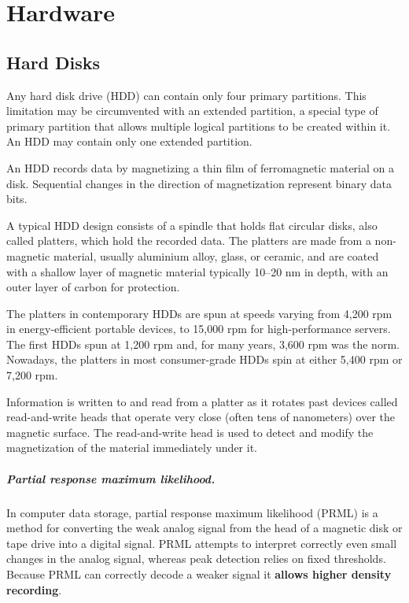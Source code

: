 \documentclass[oneside]{book} %
\theoremstyle{plain}
\begin{document}
\chapter{Hardware}
\section{Hard Disks}
Any hard disk drive (HDD) can contain only four primary partitions. This
limitation may be circumvented with an extended partition, a special type of
primary partition that allows multiple logical partitions to be created within
it. An HDD may contain only one extended partition.

An HDD records data by magnetizing a thin film of ferromagnetic material on a
disk. Sequential changes in the direction of magnetization represent binary
data bits.

A typical HDD design consists of a spindle that holds flat circular disks, also
called platters, which hold the recorded data. The platters are made from a
non-magnetic material, usually aluminium alloy, glass, or ceramic, and are
coated with a shallow layer of magnetic material typically 10–20 nm in depth,
with an outer layer of carbon for protection.

The platters in contemporary HDDs are spun at speeds varying from 4,200 rpm in
energy-efficient portable devices, to 15,000 rpm for high-performance servers.
The first HDDs spun at 1,200 rpm and, for many years, 3,600 rpm was the norm.
Nowadays, the platters in most consumer-grade HDDs spin at either 5,400 rpm or
7,200 rpm.

Information is written to and read from a platter as it rotates past devices
called read-and-write heads that operate very close (often tens of nanometers)
over the magnetic surface. The read-and-write head is used to detect and modify
the magnetization of the material immediately under it.

\paragraph{Partial response maximum likelihood.} In computer data storage,
partial response maximum likelihood (PRML) is a method for converting the weak
analog signal from the head of a magnetic disk or tape drive into a digital
signal. PRML attempts to interpret correctly even small changes in the analog
signal, whereas peak detection relies on fixed thresholds. Because PRML can
correctly decode a weaker signal it \textbf{allows higher density recording}.
\end{document}
